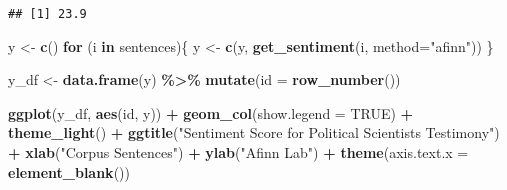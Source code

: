 \documentclass[]{article}
\newenvironment{Shaded}{\begin{snugshade}}{\end{snugshade}}
\newcommand{\ControlFlowTok}[1]{\textcolor[rgb]{0.13,0.29,0.53}{\textbf{#1}}}
\newcommand{\DataTypeTok}[1]{\textcolor[rgb]{0.13,0.29,0.53}{#1}}
\newcommand{\DecValTok}[1]{\textcolor[rgb]{0.00,0.00,0.81}{#1}}
\newcommand{\KeywordTok}[1]{\textcolor[rgb]{0.13,0.29,0.53}{\textbf{#1}}}
\newcommand{\NormalTok}[1]{#1}
\newcommand{\OperatorTok}[1]{\textcolor[rgb]{0.81,0.36,0.00}{\textbf{#1}}}
\newcommand{\OtherTok}[1]{\textcolor[rgb]{0.56,0.35,0.01}{#1}}
\newcommand{\StringTok}[1]{\textcolor[rgb]{0.31,0.60,0.02}{#1}}
\begin{document}
\hypertarget{htmlwidget-9726f3b1a5df3cdc0d65}{}

\begin{Shaded}
\end{Shaded}

\begin{verbatim}
## [1] 23.9
\end{verbatim}

\begin{Shaded}
\begin{Highlighting}[]
\NormalTok{y \textless{}{-}}\StringTok{ }\KeywordTok{c}\NormalTok{()}
\ControlFlowTok{for}\NormalTok{ (i }\ControlFlowTok{in}\NormalTok{ sentences)\{}
\NormalTok{  y \textless{}{-}}\StringTok{ }\KeywordTok{c}\NormalTok{(y, }\KeywordTok{get\_sentiment}\NormalTok{(i, }\DataTypeTok{method=}\StringTok{"afinn"}\NormalTok{))}
\NormalTok{\}}

\NormalTok{y\_df \textless{}{-}}\StringTok{ }\KeywordTok{data.frame}\NormalTok{(y) }\OperatorTok{\%\textgreater{}\%}\StringTok{ }
\StringTok{  }\KeywordTok{mutate}\NormalTok{(}\DataTypeTok{id =} \KeywordTok{row\_number}\NormalTok{())}

\KeywordTok{ggplot}\NormalTok{(y\_df, }\KeywordTok{aes}\NormalTok{(id, y)) }\OperatorTok{+}
\StringTok{  }\KeywordTok{geom\_col}\NormalTok{(}\DataTypeTok{show.legend =} \OtherTok{TRUE}\NormalTok{) }\OperatorTok{+}
\StringTok{  }\KeywordTok{theme\_light}\NormalTok{() }\OperatorTok{+}\StringTok{ }
\StringTok{  }\KeywordTok{ggtitle}\NormalTok{(}\StringTok{"Sentiment Score for Political Scientist\textquotesingle{}s Testimony"}\NormalTok{) }\OperatorTok{+}\StringTok{  }
\StringTok{  }\KeywordTok{xlab}\NormalTok{(}\StringTok{"Corpus Sentences"}\NormalTok{) }\OperatorTok{+}\StringTok{ }
\StringTok{  }\KeywordTok{ylab}\NormalTok{(}\StringTok{"Afinn Lab"}\NormalTok{) }\OperatorTok{+}\StringTok{ }
\StringTok{  }\KeywordTok{theme}\NormalTok{(}\DataTypeTok{axis.text.x =} \KeywordTok{element\_blank}\NormalTok{()) }
\end{Highlighting}
\end{Shaded}
\end{document}
